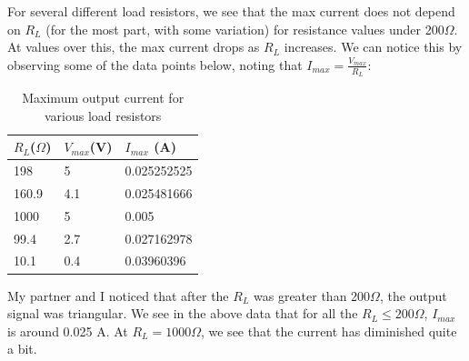 \documentclass{article}
\begin{document}
    For several different load resistors, we see that the max current does not depend on $R_L$ (for the most part, with some variation) for resistance values under 200$\Omega$. At values over this, the max current drops as $R_L$ increases. We can notice this by observing some of the data points below, noting that $I_{max} = \frac{V_{max}}{R_L}$:
    \begin{table}[H]
        \centering
        \caption{Maximum output current for various load resistors}
        \label{my-label}
        \begin{tabular}{lll}
        \textbf{$R_L$($\Omega$)} & \textbf{$V_{max}$(V)} & \textbf{$I_{max}$ (A)} \\ \hline
        198 & 5 & 0.025252525 \\
        160.9 & 4.1 & 0.025481666 \\
        1000 & 5 & 0.005 \\
        99.4 & 2.7 & 0.027162978 \\
        10.1 & 0.4 & 0.03960396
        \end{tabular}
        \end{table}
    My partner and I noticed that after the $R_L$ was greater than 200$\Omega$, the output signal was triangular. We see in the above data that for all the $R_L \leq 200\Omega$, $I_{max}$ is around 0.025 A. At $R_L = 1000\Omega$, we see that the current has diminished quite a bit.

\end{document}
